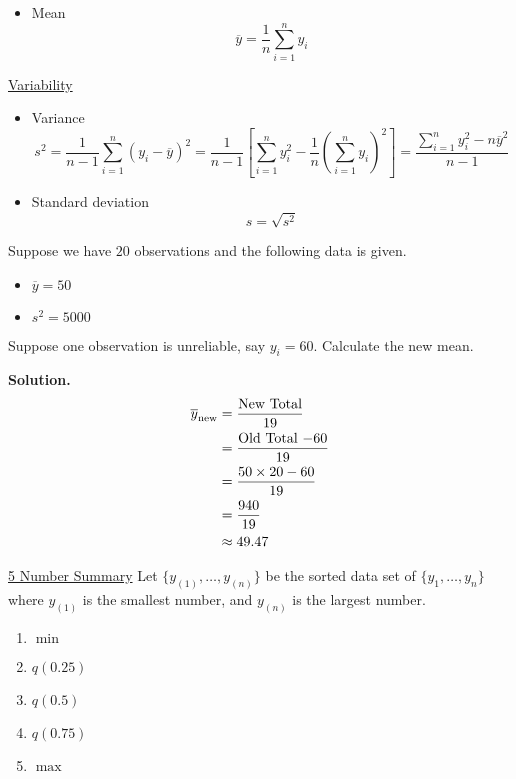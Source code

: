 \begin{itemize}
    \item Mean
          \[ \overline{y}=\frac{1}{n} \sum_{i=1}^{n} y_{i} \]

\end{itemize}

\underline{Variability}
\begin{itemize}
    \item Variance
          \[ s^{2}=\frac{1}{n-1} \sum_{i=1}^{n}\left(y_{i}-\overline{y}\right)^{2}=\frac{1}{n-1}\left[\sum_{i=1}^{n} y_{i}^{2}-\frac{1}{n}
                  \left(\sum_{i=1}^{n} y_{i}\right)^{2}\right]=\frac{\sum_{i=1}^{n} y_{i}^{2}-n \overline{y}^{2}}{n-1} \]
    \item Standard deviation
          \[ s=\sqrt{s^2} \]
\end{itemize}
\begin{exbox}
    \begin{example}
        Suppose we have $ 20 $ observations and the following data is given.
        \begin{itemize}
            \item $ \overline{y}=50 $
            \item $ s^2=5000 $
        \end{itemize}
        Suppose one observation is unreliable, say $ y_i=60 $. Calculate
        the new mean.

        \textbf{Solution.}
        \begin{align*}
            \overline{y}_{\text{new}}
             & =\frac{\text{New Total}}{19}          \\
             & =\frac{\text{Old Total $ - 60 $}}{19} \\
             & =\frac{50\times 20-60}{19}            \\
             & =\frac{940}{19}                       \\
             & \approx 49.47
        \end{align*}
    \end{example}
\end{exbox}
\underline{5 Number Summary}
Let $ \{y_{(1)},\ldots ,y_{(n)}\} $ be the sorted data set of $ \{y_1,\ldots ,y_n\} $
where $ y_{(1)} $ is the smallest number, and $ y_{(n)} $ is the largest number.
\begin{enumerate}[(1)]
    \item $ \min $
    \item $ q(0.25) $
    \item $ q(0.5) $
    \item $ q(0.75) $
    \item $ \max $
\end{enumerate}
